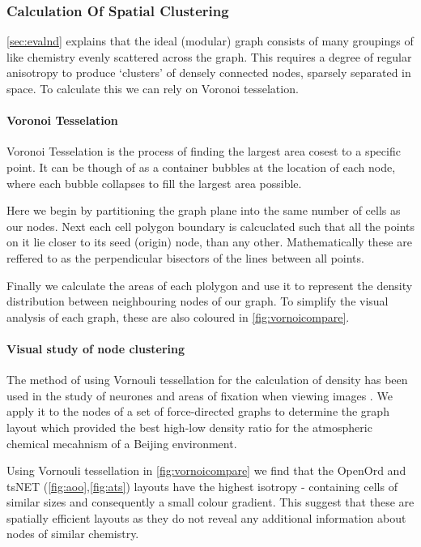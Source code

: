\subsubsection{Calculation Of Spatial Clustering}\label{sec:nodedensitya}
\autoref{sec:evalnd} explains that the ideal (modular) graph consists of many groupings of like chemistry evenly scattered across the graph.  This requires a degree of regular anisotropy to produce `clusters' of densely connected nodes, sparsely separated in space. To calculate this we can rely on Voronoi tesselation. 



\paragraph*{Voronoi Tesselation}
Voronoi Tesselation is the process of finding the largest area cosest to a specific point. It can be though of as a container bubbles at the location of each node, where each bubble collapses to fill the largest area possible.

Here we begin by partitioning the graph plane into the same number of cells as our nodes. Next each cell polygon boundary is calcuclated such that all the points on it lie closer to its seed (origin) node, than any other. Mathematically these are reffered to as the perpendicular bisectors of the lines between all points. 

Finally we calculate the areas of each plolygon and use it to represent the density distribution between neighbouring nodes of our graph. To simplify the visual analysis of each graph, these are also coloured in \autoref{fig:vornoicompare}. 


\paragraph*{Visual study of node clustering}

The method of using Vornouli tessellation for the calculation of density has been used in the study of neurones \citep{neurone} and areas of fixation when viewing images \citep{fixation}. We apply it to the nodes of a set of force-directed graphs to determine the graph layout which provided the best high-low density ratio for the atmospheric chemical mecahnism of a Beijing environment.
 
Using Vornouli tessellation in \autoref{fig:vornoicompare} we find that 
the OpenOrd and tsNET (\autoref{fig:aoo},\autoref{fig:ats}) layouts have the highest isotropy - containing cells of similar sizes and consequently a small colour gradient. This suggest that these are spatially efficient layouts as they do not reveal any additional information about nodes of similar chemistry. 

